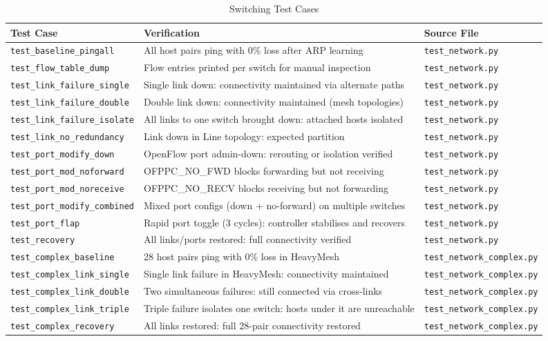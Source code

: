 \documentclass[12pt,a4paper]{article}
\begin{document}
\begin{table}[H]
\centering
\small
\begin{tabular}{@{}p{4.5cm}p{5.5cm}p{3.5cm}@{}}
\toprule
\textbf{Test Case} & \textbf{Verification} & \textbf{Source File} \\
\midrule
\texttt{test\_baseline\_pingall} & All host pairs ping with 0\% loss after ARP learning & \texttt{test\_network.py} \\
\texttt{test\_flow\_table\_dump} & Flow entries printed per switch for manual inspection & \texttt{test\_network.py} \\
\texttt{test\_link\_failure\_single} & Single link down: connectivity maintained via alternate paths & \texttt{test\_network.py} \\
\texttt{test\_link\_failure\_double} & Double link down: connectivity maintained (mesh topologies) & \texttt{test\_network.py} \\
\texttt{test\_link\_failure\_isolate} & All links to one switch brought down: attached hosts isolated & \texttt{test\_network.py} \\
\texttt{test\_link\_no\_redundancy} & Link down in Line topology: expected partition & \texttt{test\_network.py} \\
\texttt{test\_port\_modify\_down} & OpenFlow port admin-down: rerouting or isolation verified & \texttt{test\_network.py} \\
\texttt{test\_port\_mod\_noforward} & OFPPC\_NO\_FWD blocks forwarding but not receiving & \texttt{test\_network.py} \\
\texttt{test\_port\_mod\_noreceive} & OFPPC\_NO\_RECV blocks receiving but not forwarding & \texttt{test\_network.py} \\
\texttt{test\_port\_modify\_combined} & Mixed port configs (down + no-forward) on multiple switches & \texttt{test\_network.py} \\
\texttt{test\_port\_flap} & Rapid port toggle (3 cycles): controller stabilises and recovers & \texttt{test\_network.py} \\
\texttt{test\_recovery} & All links/ports restored: full connectivity verified & \texttt{test\_network.py} \\
\midrule
\texttt{test\_complex\_baseline} & 28 host pairs ping with 0\% loss in HeavyMesh & \texttt{test\_network\_complex.py} \\
\texttt{test\_complex\_link\_single} & Single link failure in HeavyMesh: connectivity maintained & \texttt{test\_network\_complex.py} \\
\texttt{test\_complex\_link\_double} & Two simultaneous failures: still connected via cross-links & \texttt{test\_network\_complex.py} \\
\texttt{test\_complex\_link\_triple} & Triple failure isolates one switch: hosts under it are unreachable & \texttt{test\_network\_complex.py} \\
\texttt{test\_complex\_recovery} & All links restored: full 28-pair connectivity restored & \texttt{test\_network\_complex.py} \\
\bottomrule
\end{tabular}
\caption{Switching Test Cases}
\end{table}
\end{document}
